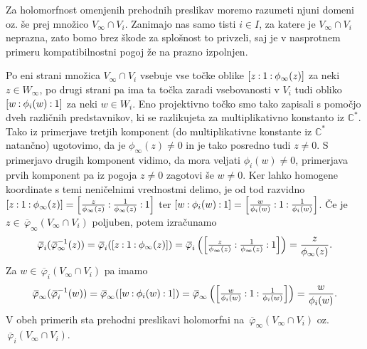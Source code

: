 \documentclass[mat1]{fmfdelo}
\numberwithin{equation}{section}
\newcommand{\CM}{\mathbb C ^*}
\newcommand{\inv}{^{-1}}
\newcommand{\pcoor}[1]{%
\begingroup\lccode`~=`: \lowercase{\endgroup
\edef~}{\mathbin{\mathchar\the\mathcode`:}\nobreak}%
\left[%
\begingroup
\mathcode`:=\string"8000
#1%
\endgroup
\right]%
}
\newcommand{\olsi}[1]{\,\overline{\!{#1}}} %
\theoremstyle{definition}
\begin{document}
Za holomorfnost omenjenih prehodnih preslikav moremo razumeti njuni domeni oz. še prej množico $V_\infty \cap V_i$. Zanimajo nas samo tisti $i \in I$, za katere je $V_\infty \cap V_i$ neprazna, zato bomo brez škode za splošnost to privzeli, saj je v nasprotnem primeru kompatibilnostni pogoj že na prazno izpolnjen. 

Po eni strani množica $V_\infty \cap V_i$ vsebuje vse točke oblike $\pcoor{z : 1 : \phi_\infty(z)}$ za neki $z \in W_\infty$, po drugi strani pa ima ta točka zaradi vsebovanosti v $V_i$ tudi obliko $\pcoor{w : \phi_i(w) : 1}$ za neki $w \in W_i$. Eno projektivno točko smo tako zapisali s pomočjo dveh različnih predstavnikov, ki se razlikujeta za multiplikativno konstanto iz $\CM$. Tako iz primerjave tretjih komponent (do multiplikativne konstante iz $\CM$ natančno) ugotovimo, da je $\phi_\infty(z) \neq 0$ in je tako posredno tudi $z \neq 0$. S primerjavo drugih komponent vidimo, da mora veljati $\phi_i(w) \neq 0$, primerjava prvih komponent pa iz pogoja $z \neq 0$ zagotovi še $w \neq 0$. Ker lahko homogene koordinate s temi neničelnimi vrednostmi delimo, je od tod razvidno $\pcoor{z : 1 : \phi_\infty(z)} = \pcoor{\tfrac{z}{\phi_\infty(z)} : \tfrac{1}{\phi_\infty(z)} : 1}$ ter $\pcoor{w : \phi_i(w) : 1} = \pcoor{\tfrac{w}{\phi_i(w)} : 1 : \tfrac{1}{\phi_i(w)}}$. 
Če je $z \in \olsi{\varphi}_\infty(V_\infty \cap V_i)$ poljuben, potem izračunamo 
\[
    \olsi{\varphi}_i (\olsi{\varphi}_\infty\inv (z)) = 
    \olsi{\varphi}_i (\pcoor{z : 1 : \phi_\infty(z)}) = 
    \olsi{\varphi}_i \left(\pcoor{\tfrac{z}{\phi_\infty(z)} : \tfrac{1}{\phi_\infty(z)} : 1}\right) = 
    \frac{z}{\phi_\infty(z)}.
\]
Za $w \in \olsi{\varphi}_i(V_\infty \cap V_i)$ pa imamo
\[
    \olsi{\varphi}_\infty (\olsi{\varphi}_i\inv(w)) =
    \olsi{\varphi}_\infty (\pcoor{w : \phi_i(w) : 1}) =
    \olsi{\varphi}_\infty \left(\pcoor{\tfrac{w}{\phi_i(w)} : 1 : \tfrac{1}{\phi_i(w)}}\right) =
    \frac{w}{\phi_i(w)}.
\]
V obeh primerih sta prehodni preslikavi holomorfni na $\olsi{\varphi}_\infty(V_\infty \cap V_i)$ oz. $\olsi{\varphi}_i(V_\infty \cap V_i)$.
\end{document}
